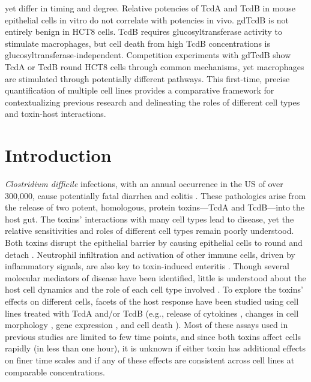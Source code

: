 yet differ in timing and degree. Relative potencies of TcdA and 
TcdB in mouse epithelial cells in vitro do not correlate with 
potencies in vivo. gdTcdB is not entirely benign in HCT8 cells. 
TcdB requires glucosyltransferase activity to stimulate macrophages, 
but cell death from high TcdB concentrations is 
glucosyltransferase-independent. Competition experiments with gdTcdB show 
TcdA or TcdB round HCT8 cells through common mechanisms, yet 
macrophages are stimulated through potentially different pathways. 
This first-time, precise quantification of multiple cell lines 
provides a comparative framework for contextualizing previous 
research and delineating the roles of different cell types and 
toxin-host interactions.

\section{Introduction}
\textit{Clostridium difficile} infections, with an annual occurrence in the 
US of over 300,000, cause potentially fatal diarrhea and colitis \cite{Lucado:2012wl}. 
These pathologies arise from the release of two potent, homologous, 
protein toxins—TcdA and TcdB—into the host gut. The toxins' 
interactions with many cell types lead to disease, yet the relative 
sensitivities and roles of different cell types remain poorly 
understood. Both toxins disrupt the epithelial barrier by causing 
epithelial cells to round and detach \cite{Pothoulakis:2000via}. Neutrophil infiltration 
and activation of other immune cells, driven by inflammatory 
signals, are also key to toxin-induced enteritis \cite{Kelly:1994cu}. Though 
several molecular mediators of disease have been identified, 
little is understood about the host cell dynamics and the role 
of each cell type involved \cite{Sun:2010kt,Shen:2012cm}. To explore the toxins' 
effects on different cells, facets of the host response have 
been studied using cell lines treated with TcdA and/or TcdB 
(e.g., release of cytokines \cite{Sun:2010kt,Castagliuolo:1998um,Kelly:1994wd}, changes in cell 
morphology \cite{Grossmann:2000cg,Brito:2002kq}, 
gene expression \cite{DAuria:2012bd,Gerhard:2005dg}, 
and cell death \cite{Solomon:2005dv,Gerhard:2008wz}). 
Most of these assays used in previous studies are limited to 
few time points, and since both toxins affect cells rapidly 
(in less than one hour), it is unknown if either toxin has 
additional effects on finer time scales and if any of these 
effects are consistent across cell lines at comparable concentrations.

